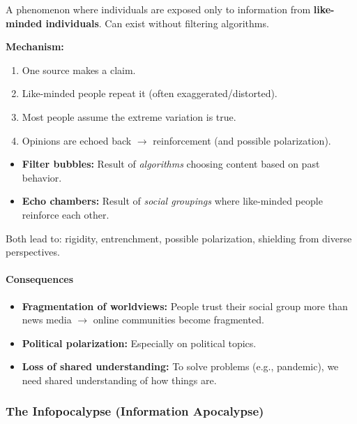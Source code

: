 \begin{defbox}
A phenomenon where individuals are exposed only to information from \textbf{like-minded individuals}. Can exist without filtering algorithms.

\textbf{Mechanism:}
\begin{enumerate}
  \item One source makes a claim.
  \item Like-minded people repeat it (often exaggerated/distorted).
  \item Most people assume the extreme variation is true.
  \item Opinions are echoed back $\to$ reinforcement (and possible polarization).
\end{enumerate}
\end{defbox}

\begin{tipbox}
\begin{itemize}
  \item \textbf{Filter bubbles:} Result of \textit{algorithms} choosing content based on past behavior.
  \item \textbf{Echo chambers:} Result of \textit{social groupings} where like-minded people reinforce each other.
\end{itemize}
Both lead to: rigidity, entrenchment, possible polarization, shielding from diverse perspectives.
\end{tipbox}

\paragraph*{Consequences}

\begin{itemize}
  \item \textbf{Fragmentation of worldviews:} People trust their social group more than news media $\to$ online communities become fragmented.
  \item \textbf{Political polarization:} Especially on political topics.
  \item \textbf{Loss of shared understanding:} To solve problems (e.g., pandemic), we need shared understanding of how things are.
\end{itemize}

\separator

\subsubsection{The Infopocalypse (Information Apocalypse)}

